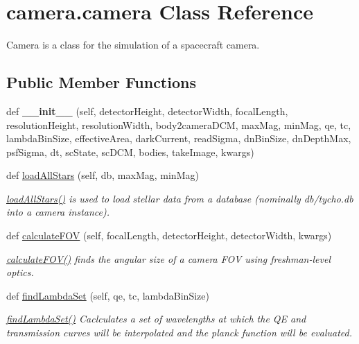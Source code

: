 \hypertarget{classcamera_1_1camera}{}\section{camera.\+camera Class Reference}
\label{classcamera_1_1camera}


Camera is a class for the simulation of a spacecraft camera.  


\subsection*{Public Member Functions}
\begin{DoxyCompactItemize}
\item 
\mbox{\label{classcamera_1_1camera_af2e47484e5413e0aa427418cfdd6b679}} 
def {\bfseries \+\_\+\+\_\+init\+\_\+\+\_\+} (self, detector\+Height, detector\+Width, focal\+Length, resolution\+Height, resolution\+Width, body2camera\+D\+CM, max\+Mag, min\+Mag, qe, tc, lambda\+Bin\+Size, effective\+Area, dark\+Current, read\+Sigma, dn\+Bin\+Size, dn\+Depth\+Max, psf\+Sigma, dt, sc\+State, sc\+D\+CM, bodies, take\+Image, kwargs)
\item 
def \hyperlink{classcamera_1_1camera_a19a245a417b72f0ae753b5200b1615ff}{load\+All\+Stars} (self, db, max\+Mag, min\+Mag)
\begin{DoxyCompactList}\small\item\em \hyperlink{classcamera_1_1camera_a19a245a417b72f0ae753b5200b1615ff}{load\+All\+Stars()} is used to load stellar data from a database (nominally db/tycho.\+db into a camera instance). \end{DoxyCompactList}\item 
def \hyperlink{classcamera_1_1camera_ad4494bee9257f3d3456b93d26ba9a5a0}{calculate\+F\+OV} (self, focal\+Length, detector\+Height, detector\+Width, kwargs)
\begin{DoxyCompactList}\small\item\em \hyperlink{classcamera_1_1camera_ad4494bee9257f3d3456b93d26ba9a5a0}{calculate\+F\+O\+V()} finds the angular size of a camera F\+OV using freshman-\/level optics. \end{DoxyCompactList}\item 
def \hyperlink{classcamera_1_1camera_aeec423a87b32526d88ca5db5c662a462}{find\+Lambda\+Set} (self, qe, tc, lambda\+Bin\+Size)
\begin{DoxyCompactList}\small\item\em \hyperlink{classcamera_1_1camera_aeec423a87b32526d88ca5db5c662a462}{find\+Lambda\+Set()} Caclculates a set of wavelengths at which the QE and transmission curves will be interpolated and the planck function will be evaluated. \end{DoxyCompactList}\item 

\end{DoxyCompactItemize}
